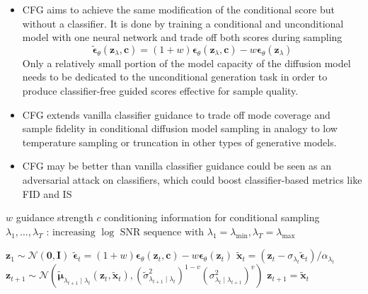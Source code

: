 \documentclass{article}
\begin{document}
\begin{itemize}
\item CFG aims to achieve the same modification of the conditional score but without a classifier. It is done by training a conditional and unconditional model with one neural network and trade off both scores during sampling 
$$
\tilde{\boldsymbol{\epsilon}}_\theta\left(\mathbf{z}_\lambda, \mathbf{c}\right)=(1+w) \boldsymbol{\epsilon}_\theta\left(\mathbf{z}_\lambda, \mathbf{c}\right)-w \boldsymbol{\epsilon}_\theta\left(\mathbf{z}_\lambda\right)
$$
Only a relatively small portion of the model capacity of the diffusion model needs to be dedicated to the unconditional generation task in order to produce classifier-free guided scores effective for sample quality.
\item CFG extends vanilla classifier guidance to trade off mode coverage and sample fidelity in conditional diffusion model sampling in analogy to low temperature sampling or truncation in other types of generative models.
\item CFG may be better than vanilla classifier guidance could be seen as an adversarial attack on classifiers, which could boost classifier-based metrics like FID and IS
\end{itemize}

\begin{algorithm}
\caption{Conditional sampling with classifier-free guidance}%
\begin{algorithmic}
\Require $w$ guidance strength
\Require $c$ conditioning information for conditional sampling 
\Require $\lambda_1, \ldots, \lambda_T \text { : increasing } \log \text { SNR sequence with } \lambda_1=\lambda_{\min }, \lambda_T=\lambda_{\max }$

\State $\mathbf{z}_1 \sim \mathcal{N}(\mathbf{0}, \mathbf{I})$
\State $\tilde{\boldsymbol{\epsilon}}_t=(1+w) \boldsymbol{\epsilon}_\theta\left(\mathbf{z}_t, \mathbf{c}\right)-w \boldsymbol{\epsilon}_\theta\left(\mathbf{z}_t\right)$
\State $\tilde{\mathbf{x}}_t=\left(\mathbf{z}_t-\sigma_{\lambda_t} \tilde{\boldsymbol{\epsilon}}_t\right) / \alpha_{\lambda_t}$ 
\State $\mathbf{z}_{t+1} \sim \mathcal{N}\left(\tilde{\boldsymbol{\mu}}_{\lambda_{t+1} \mid \lambda_t}\left(\mathbf{z}_t, \tilde{\mathbf{x}}_t\right),\left(\tilde{\sigma}_{\lambda_{t+1} \mid \lambda_t}^2\right)^{1-v}\left(\sigma_{\lambda_t \mid \lambda_{t+1}}^2\right)^v\right)$
\Else
\State $\mathbf{z}_{t+1}=\tilde{\mathbf{x}}_t$
\EndIf
\EndFor
\end{algorithmic}
\end{algorithm}
\end{document}
